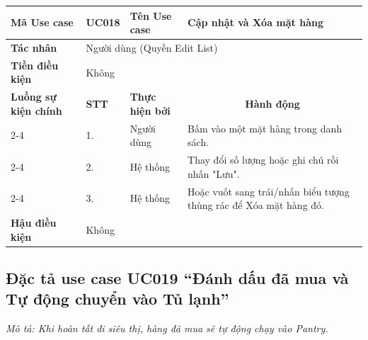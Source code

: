 \documentclass[../main.tex]{subfiles}
\begin{document}
\begin{longtable}{|p{2.7cm}|p{0.8cm}|p{2.6cm}|p{7.3cm}|}
\hline
\cellcolor[HTML]{D5F5E3}\textbf{Mã Use case} & \multicolumn{1}{l|}{UC018} & \cellcolor[HTML]{D5F5E3}\textbf{Tên Use case} & Cập nhật và Xóa mặt hàng \\ \hline
\cellcolor[HTML]{D5F5E3}\textbf{Tác nhân} & \multicolumn{3}{p{10.7cm}|}{Người dùng (Quyền Edit List)} \\ \hline
\cellcolor[HTML]{D5F5E3}\textbf{Tiền điều kiện} & \multicolumn{3}{p{10.7cm}|}{Không} \\ \hline

\cellcolor[HTML]{D5F5E3}\textbf{Luồng sự kiện chính} & \cellcolor[HTML]{FDEBD0}\textbf{STT} & \cellcolor[HTML]{FDEBD0}\textbf{Thực hiện bởi} & \multicolumn{1}{c|}{\cellcolor[HTML]{FDEBD0}\textbf{Hành động}} \\ \cline{2-4} 
\cellcolor[HTML]{D5F5E3} & 1. & Người dùng & Bấm vào một mặt hàng trong danh sách. \\ \cline{2-4} 
\cellcolor[HTML]{D5F5E3} & 2. & Hệ thống & Thay đổi số lượng hoặc ghi chú rồi nhấn "Lưu". \\ \cline{2-4} 
\cellcolor[HTML]{D5F5E3} & 3. & Hệ thống & Hoặc vuốt sang trái/nhấn biểu tượng thùng rác để Xóa mặt hàng đó. \\ \hline

\cellcolor[HTML]{D5F5E3}\textbf{Hậu điều kiện} & \multicolumn{3}{p{10.7cm}|}{Không} \\ \hline
\end{longtable}
\endgroup

\subsection{Đặc tả use case UC019 ``Đánh dấu đã mua và Tự động chuyển vào Tủ lạnh''}
\textit{Mô tả: Khi hoàn tất đi siêu thị, hàng đã mua sẽ tự động chạy vào Pantry.}
\vspace{0.5cm}

\begingroup
\renewcommand{\arraystretch}{1.5}
\end{document}
